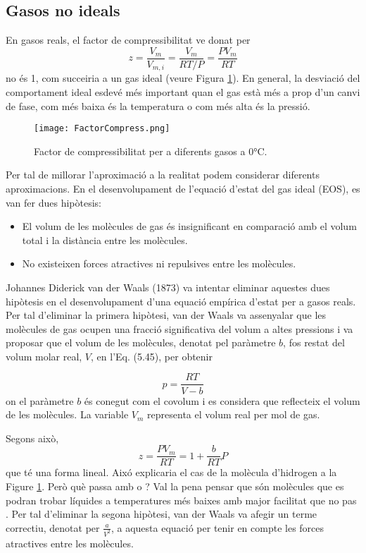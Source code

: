 %


\subsection{Gasos no ideals}



En gasos reals, el factor de compressibilitat ve donat per
\[z=\frac{V_m}{V_{m,i}}=\frac{V_m}{RT/P}=\frac{PV_m}{RT}\]
no és 1, com succeiria a un gas ideal (veure Figura \ref{fig:FactorCompress}). En general, la desviació del comportament ideal esdevé més important quan el gas està més a prop d'un canvi de fase, com més baixa és la temperatura o com més alta és la pressió. 
\begin{figure}[h]
\centering
\texttt{[image: FactorCompress.png]}
\caption{Factor de compressibilitat per a diferents gasos a 0\si\degreeCelsius.}
\label{fig:FactorCompress}
\end{figure}

Per tal de millorar l'aproximació a la realitat podem considerar diferents aproximacions. 
En el desenvolupament de l'equació d'estat del gas ideal (EOS), es van fer dues hipòtesis:

\begin{itemize}
    \item El volum de les molècules de gas és insignificant en comparació amb el volum total i la distància entre les molècules.
    \item No existeixen forces atractives ni repulsives entre les molècules.
\end{itemize}

Johannes Diderick van der Waals (1873) va intentar eliminar aquestes dues hipòtesis en el desenvolupament d'una equació empírica d'estat per a gasos reals. Per tal d'eliminar la primera hipòtesi, van der Waals va assenyalar que les molècules de gas ocupen una fracció significativa del volum a altes pressions i va proposar que el volum de les molècules, denotat pel paràmetre $b$, fos restat del volum molar real, $V$, en l'Eq. (5.45), per obtenir

\[
p = \frac{RT}{V - b}
\]
on el paràmetre $b$ és conegut com el covolum i es considera que reflecteix el volum de les molècules. La variable $V_m$ representa el volum real per mol de gas.

Segons això,
\[z=\frac{PV_m}{RT}=1+\frac{b}{RT}P\]
que té una forma lineal. Aixó explicaria el cas de la molècula d'hidrogen a la Figure \ref{fig:FactorCompress}.
Però què passa amb  o ? Val la pena pensar que són molècules que es podran trobar líquides a temperatures més baixes amb major facilitat que no pas . 
Per tal d'eliminar la segona hipòtesi, van der Waals va afegir un terme correctiu, denotat per $\frac{a}{V^2}$, a aquesta equació per tenir en compte les forces atractives entre les molècules.

